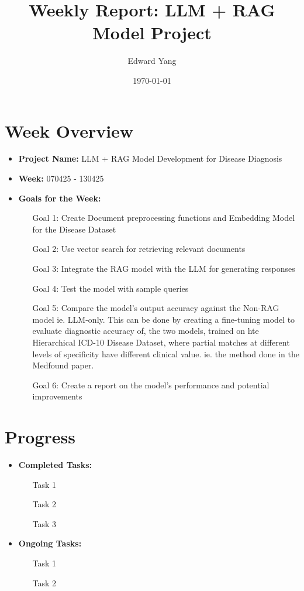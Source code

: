 \documentclass[12pt]{article}
\title{Weekly Report: LLM + RAG Model Project}
\author{Edward Yang}
\date{\today}
\begin{document}
\maketitle

\section*{Week Overview}
\begin{itemize}
    \item \textbf{Project Name:} LLM + RAG Model Development for Disease Diagnosis
    \item \textbf{Week:} 070425 - 130425
    \item \textbf{Goals for the Week:}
    \begin{itemize}
        \item [Goal 1: Create Document preprocessing functions and Embedding Model for the Disease Dataset]
        \item [Goal 2: Use vector search for retrieving relevant documents]
        \item [Goal 3: Integrate the RAG model with the LLM for generating responses]
        \item [Goal 4: Test the model with sample queries]
        \item [Goal 5: Compare the model's output accuracy against the Non-RAG model ie. LLM-only. This can be done by creating a fine-tuning model to evaluate diagnostic accuracy of, the two models, trained on hte Hierarchical ICD-10 Disease Dataset, where partial matches at different levels of specificity have different clinical value. ie. the method done in the Medfound paper.]
        \item [Goal 6: Create a report on the model's performance and potential improvements]
    \end{itemize}
\end{itemize}

\section*{Progress}
\begin{itemize}
    \item \textbf{Completed Tasks:}
    \begin{itemize}
        \item [Task 1]
        \item [Task 2]
        \item [Task 3]
    \end{itemize}
    \item \textbf{Ongoing Tasks:}
    \begin{itemize}
        \item [Task 1]
        \item [Task 2]
    \end{itemize}
\end{itemize}
\end{document}

